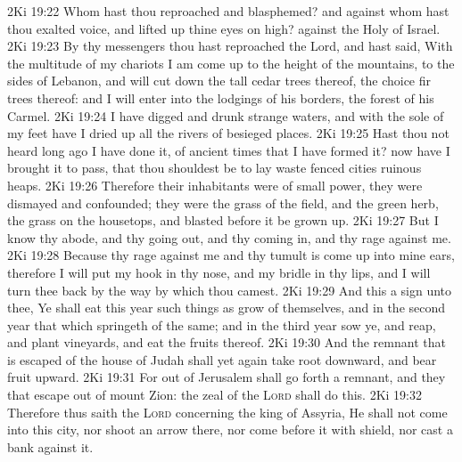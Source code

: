 \vs 2Ki 19:22 Whom hast thou reproached and blasphemed? and against whom hast thou exalted  voice, and lifted up thine eyes on high?  against the Holy  of Israel.
\vs 2Ki 19:23 By thy messengers thou hast reproached the Lord, and hast said, With the multitude of my chariots I am come up to the height of the mountains, to the sides of Lebanon, and will cut down the tall cedar trees thereof,  the choice fir trees thereof: and I will enter into the lodgings of his borders,  the forest of his Carmel.
\vs 2Ki 19:24 I have digged and drunk strange waters, and with the sole of my feet have I dried up all the rivers of besieged places.
\vs 2Ki 19:25 Hast thou not heard long ago  I have done it,  of ancient times that I have formed it? now have I brought it to pass, that thou shouldest be to lay waste fenced cities  ruinous heaps.
\vs 2Ki 19:26 Therefore their inhabitants were of small power, they were dismayed and confounded; they were  the grass of the field, and  the green herb,  the grass on the housetops, and  blasted before it be grown up.
\vs 2Ki 19:27 But I know thy abode, and thy going out, and thy coming in, and thy rage against me.
\vs 2Ki 19:28 Because thy rage against me and thy tumult is come up into mine ears, therefore I will put my hook in thy nose, and my bridle in thy lips, and I will turn thee back by the way by which thou camest.
\vs 2Ki 19:29 And this  a sign unto thee, Ye shall eat this year such things as grow of themselves, and in the second year that which springeth of the same; and in the third year sow ye, and reap, and plant vineyards, and eat the fruits thereof.
\vs 2Ki 19:30 And the remnant that is escaped of the house of Judah shall yet again take root downward, and bear fruit upward.
\vs 2Ki 19:31 For out of Jerusalem shall go forth a remnant, and they that escape out of mount Zion: the zeal of the \textsc{Lord}  shall do this.
\vs 2Ki 19:32 Therefore thus saith the \textsc{Lord} concerning the king of Assyria, He shall not come into this city, nor shoot an arrow there, nor come before it with shield, nor cast a bank against it.
